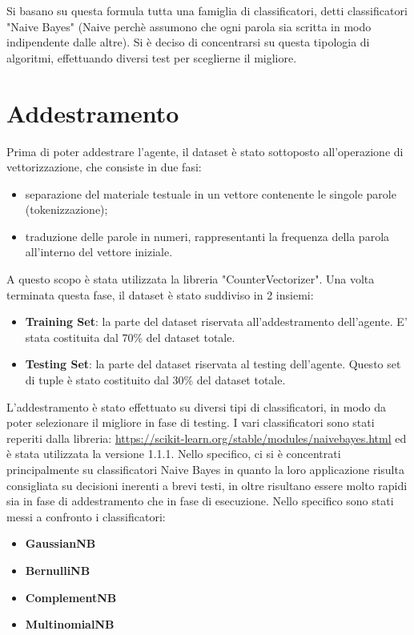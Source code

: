 \documentclass{report}
\begin{document}
    Si basano su questa formula tutta una famiglia di classificatori, detti classificatori "Naive Bayes" (Naive perchè assumono che ogni parola sia scritta in modo indipendente dalle altre).
    Si è deciso di concentrarsi su questa tipologia di algoritmi, effettuando diversi test per sceglierne il migliore.


    \section{Addestramento}
    Prima di poter addestrare l'agente, il dataset è stato sottoposto all'operazione di vettorizzazione, che consiste in due fasi:
    \begin{itemize}
        \item separazione del materiale testuale in un vettore contenente le singole parole (tokenizzazione);
        \item traduzione delle parole in numeri, rappresentanti la frequenza della parola all'interno del vettore iniziale.
    \end{itemize}
    A questo scopo è stata utilizzata la libreria "CounterVectorizer".
    \newline
    Una volta terminata questa fase, il dataset è stato suddiviso in 2 insiemi:
    \begin{itemize}
        \item {\bfseries Training Set}: la parte del dataset riservata all'addestramento dell'agente. E' stata costituita dal 
        70\% del dataset totale.
        \item {\bfseries Testing Set}: la parte del dataset riservata al testing dell'agente. Questo set di tuple è stato 
        costituito dal 30\% del dataset totale.
    \end{itemize}
    L'addestramento è stato effettuato su diversi tipi di classificatori, in modo da poter selezionare il migliore in fase di testing.
    I vari classificatori sono stati reperiti dalla libreria: \href{https://scikit-learn.org/stable/modules/naive_bayes.html}{https://scikit-learn.org/stable/modules/naive\textunderscore bayes.html}
    ed è stata utilizzata la versione 1.1.1.
    Nello specifico, ci si è concentrati principalmente su classificatori Naive Bayes in quanto la loro applicazione risulta consigliata
    su decisioni inerenti a brevi testi, in oltre risultano essere molto rapidi sia in fase di addestramento che in fase di esecuzione.
    Nello specifico sono stati messi a confronto i classificatori:
    \begin{itemize}
        \item {\bfseries GaussianNB}
        \item {\bfseries BernulliNB}
        \item {\bfseries ComplementNB}
        \item {\bfseries MultinomialNB}
    \end{itemize}
\end{document}

